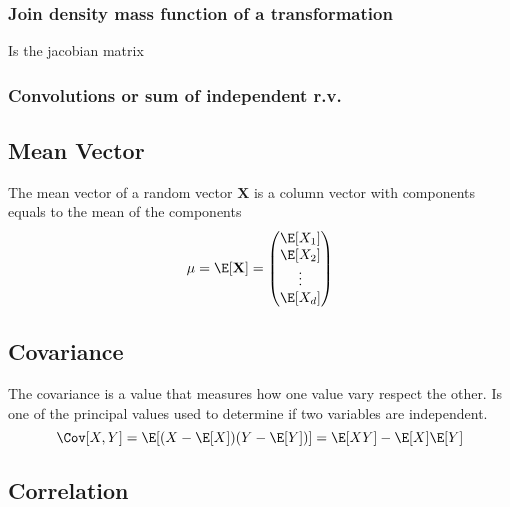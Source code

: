 \subsubsection{Join density mass function of a transformation} %
\label{ssub:join_density_mass_function_of_a_transformation}

Is the jacobian matrix

\subsubsection{Convolutions or sum of independent r.v.} %
\label{ssub:convolutions_or_sum_of_independent_r_v_}


\subsection{Mean Vector} %
\label{sub:mean_vector}

The mean vector of a random vector $\textbf{X}$ is a column vector with
components equals to the mean of the components
\begin{equation*}
    \mu = \E[\textbf{X}] = 
\begin{pmatrix}
    \E[X_1]\\
    \E[X_2]\\
    \vdots\\
    \E[X_d]
\end{pmatrix}
\end{equation*}

\subsection{Covariance} %
\label{sub:covariance}

The covariance is a value that measures how one value vary respect the other. Is
one of the principal values used to determine if two variables are independent.
\begin{equation*}
    \Cov[X,Y] = \E[(X-\E[X])(Y-\E[Y])] = \E[XY]-\E[X]\E[Y]
\end{equation*}

\subsection{Correlation} %
\label{sub:correlation}


